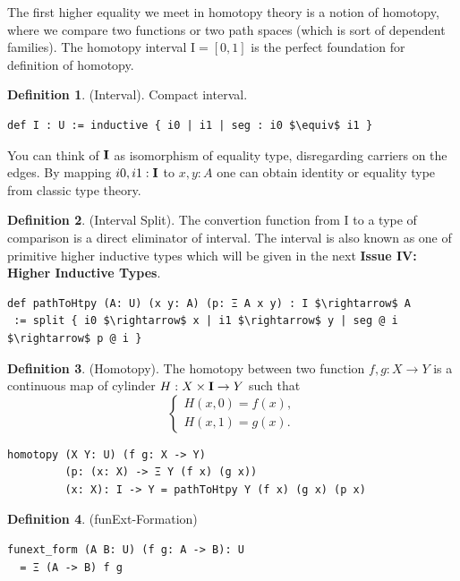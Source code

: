 \documentclass{article}
\theoremstyle{definition}
\newtheorem{definition}{Definition}
\begin{document}
The first higher equality we meet in homotopy theory is a notion of homotopy,
where we compare two functions or two path spaces (which is sort of dependent families).
The homotopy interval $\mathrm{I}=[0,1]$ is the perfect foundation for definition of homotopy.

\begin{definition} (Interval). Compact interval.
\begin{lstlisting}[mathescape=true]
def I : U := inductive { i0 | i1 | seg : i0 $\equiv$ i1 }
\end{lstlisting}
\end{definition}

You can think of ${\bf I}$ as isomorphism of equality type,
disregarding carriers on the edges. By mapping $i0,i1:{\bf I}$ to $x,y:A$ one can
obtain identity or equality type from classic type theory.

\begin{definition} (Interval Split).
The convertion function from $\mathrm{I}$ to a type of comparison
is a direct eliminator of interval. The interval is also known as one of
primitive higher inductive types which will be given in the next
{\bf Issue IV: Higher Inductive Types}.
\begin{lstlisting}[mathescape=true]
def pathToHtpy (A: U) (x y: A) (p: Ξ A x y) : I $\rightarrow$ A
 := split { i0 $\rightarrow$ x | i1 $\rightarrow$ y | seg @ i $\rightarrow$ p @ i }
\end{lstlisting}
\end{definition}

\begin{definition} (Homotopy). The homotopy between two function $f,g: X \rightarrow Y$
is a continuous map of cylinder $H : X \times {\bf I} \rightarrow Y$ such that
$$
\begin{cases}
H(x,0)=f(x), \\
H(x,1)=g(x).
\end{cases}
$$
\begin{lstlisting}
homotopy (X Y: U) (f g: X -> Y)
         (p: (x: X) -> Ξ Y (f x) (g x))
         (x: X): I -> Y = pathToHtpy Y (f x) (g x) (p x)
\end{lstlisting}
\end{definition}

\newpage
\begin{definition} (funExt-Formation)
\begin{lstlisting}
funext_form (A B: U) (f g: A -> B): U
  = Ξ (A -> B) f g
\end{lstlisting}
\end{definition}
\end{document}
